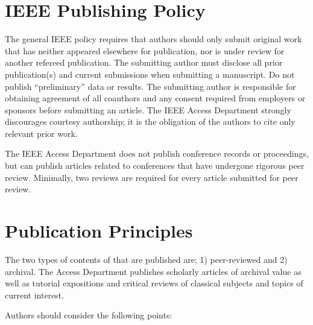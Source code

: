 \documentclass{ieeeaccess}
\begin{document}
\section{IEEE Publishing Policy}
The general IEEE policy requires that authors should only submit original
work that has neither appeared elsewhere for publication, nor is under
review for another refereed publication. The submitting author must disclose
all prior publication(s) and current submissions when submitting a
manuscript. Do not publish ``preliminary'' data or results. The submitting
author is responsible for obtaining agreement of all coauthors and any
consent required from employers or sponsors before submitting an article.
The IEEE Access Department strongly discourages courtesy
authorship; it is the obligation of the authors to cite only relevant prior
work.

The IEEE Access Department does not publish conference
records or proceedings, but can publish articles related to conferences that
have undergone rigorous peer review. Minimally, two reviews are required for
every article submitted for peer review.

\section{Publication Principles}
The two types of contents of that are published are; 1) peer-reviewed and 2)
archival. The Access Department publishes scholarly
articles of archival value as well as tutorial expositions and critical
reviews of classical subjects and topics of current interest.

Authors should consider the following points:
\end{document}
